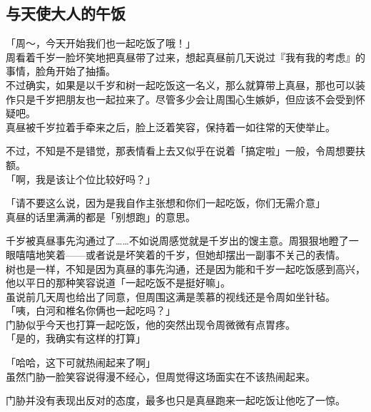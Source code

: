 \subsection{与天使大人的午饭}

「周～，今天开始我们也一起吃饭了哦！」\\

周看着千岁一脸坏笑地把真昼带了过来，想起真昼前几天说过『我有我的考虑』的事情，脸角开始了抽搐。\\

不过确实，如果是以千岁和树一起吃饭这一名义，那么就算带上真昼，那也可以装作只是千岁把朋友也一起拉来了。尽管多少会让周围心生嫉妒，但应该不会受到怀疑吧。\\

真昼被千岁拉着手牵来之后，脸上泛着笑容，保持着一如往常的天使举止。

不过，不知是不是错觉，那表情看上去又似乎在说着「搞定啦」一般，令周想要扶额。\\

「啊，我是该让个位比较好吗？」

「请不要这么说，因为是我自作主张想和你们一起吃饭，你们无需介意」\\

真昼的话里满满的都是「别想跑」的意思。

千岁被真昼事先沟通过了……不如说周感觉就是千岁出的馊主意。周狠狠地瞪了一眼嘻嘻地笑着——或者说是坏笑着的千岁，但她却摆出一副事不关己的表情。\\

树也是一样，不知是因为真昼的事先沟通，还是因为能和千岁一起吃饭感到高兴，他以平日的那种笑容说道「一起吃饭不是挺好嘛」。\\

虽说前几天周也给出了同意，但周围这满是羡慕的视线还是令周如坐针毡。\\

「咦，白河和椎名你俩也一起吃吗？」\\

门胁似乎今天也打算一起吃饭，他的突然出现令周微微有点胃疼。\\

「是的，我确实有这样的打算」

「哈哈，这下可就热闹起来了啊」\\

虽然门胁一脸笑容说得漫不经心，但周觉得这场面实在不该热闹起来。

门胁并没有表现出反对的态度，最多也只是真昼跑来一起吃饭让他吃了一惊。\\

